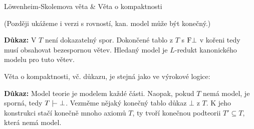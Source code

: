 \documentclass{beamer}
\begin{document}
\begin{frame}{Löwenheim-Skolemova věta \& Věta o kompaktnosti}
    
    \medskip
    

    (Později ukážeme i verzi s rovností, kan. model může být konečný.)

    \textbf{Důkaz:} V $T$ není dokazatelný spor. Dokončené tablo z $T$ s $\mathrm{F}\bot$ v kořeni tedy musí obsahovat bezespornou větev. Hledaný model je $L$-redukt kanonického modelu pro tuto větev.\hfill\qedsymbol

    \bigskip

    Věta o kompaktnosti, vč. důkazu, je stejná jako ve výrokové logice:

    \smallskip
    
    \textbf{Důkaz:} Model teorie je modelem každé části. Naopak, pokud $T$ nemá model, je sporná, tedy $T\proves\bot$. Vezměme nějaký \alert{konečný} tablo důkaz $\bot$ z $T$. K jeho konstrukci stačí konečně mnoho axiomů $T$, ty tvoří konečnou podteorii $T'\subseteq T$, která nemá model.\hfill\qedsymbol

\end{frame}
\end{document}
